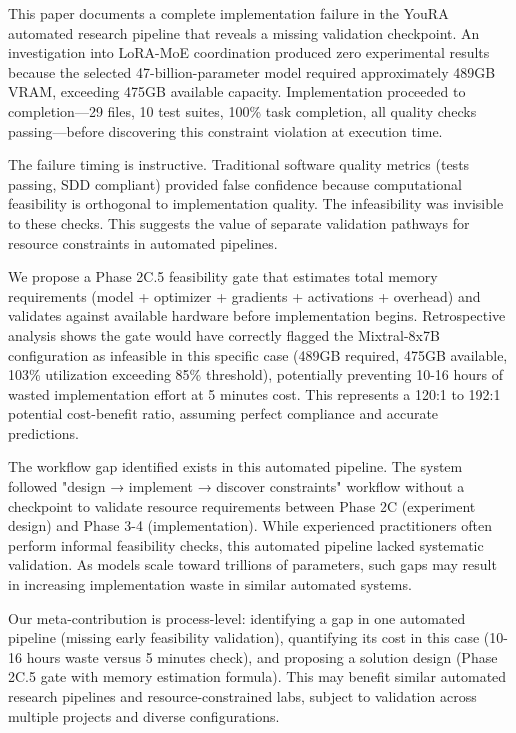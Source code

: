 
This paper documents a complete implementation failure in the YouRA automated research pipeline that reveals a missing validation checkpoint. An investigation into LoRA-MoE coordination produced zero experimental results because the selected 47-billion-parameter model required approximately 489GB VRAM, exceeding 475GB available capacity. Implementation proceeded to completion—29 files, 10 test suites, 100\% task completion, all quality checks passing—before discovering this constraint violation at execution time.

The failure timing is instructive. Traditional software quality metrics (tests passing, SDD compliant) provided false confidence because computational feasibility is orthogonal to implementation quality. The infeasibility was invisible to these checks. This suggests the value of separate validation pathways for resource constraints in automated pipelines.

We propose a Phase 2C.5 feasibility gate that estimates total memory requirements (model + optimizer + gradients + activations + overhead) and validates against available hardware before implementation begins. Retrospective analysis shows the gate would have correctly flagged the Mixtral-8x7B configuration as infeasible in this specific case (489GB required, 475GB available, 103\% utilization exceeding 85\% threshold), potentially preventing 10-16 hours of wasted implementation effort at 5 minutes cost. This represents a 120:1 to 192:1 potential cost-benefit ratio, assuming perfect compliance and accurate predictions.

The workflow gap identified exists in this automated pipeline. The system followed "design → implement → discover constraints" workflow without a checkpoint to validate resource requirements between Phase 2C (experiment design) and Phase 3-4 (implementation). While experienced practitioners often perform informal feasibility checks, this automated pipeline lacked systematic validation. As models scale toward trillions of parameters, such gaps may result in increasing implementation waste in similar automated systems.

Our meta-contribution is process-level: identifying a gap in one automated pipeline (missing early feasibility validation), quantifying its cost in this case (10-16 hours waste versus 5 minutes check), and proposing a solution design (Phase 2C.5 gate with memory estimation formula). This may benefit similar automated research pipelines and resource-constrained labs, subject to validation across multiple projects and diverse configurations.

